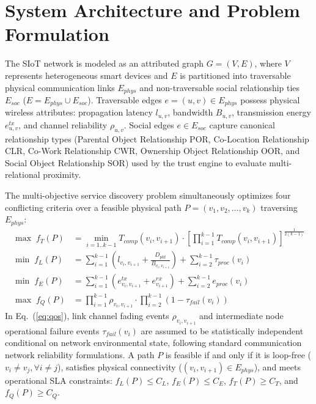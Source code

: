 \documentclass[journal,compsoc]{IEEEtran}
\begin{document}
\section{System Architecture and Problem Formulation}
The SIoT network is modeled as an attributed graph $G = (V, E)$, where $V$ represents heterogeneous smart devices and $E$ is partitioned into traversable physical communication links $E_{phys}$ and non-traversable social relationship ties $E_{soc}$ ($E = E_{phys} \cup E_{soc}$). Traversable edges $e = (u, v) \in E_{phys}$ possess physical wireless attributes: propagation latency $l_{u,v}$, bandwidth $B_{u,v}$, transmission energy $e_{u,v}^{tx}$, and channel reliability $\rho_{u,v}$. Social edges $e \in E_{soc}$ capture canonical relationship types (Parental Object Relationship POR, Co-Location Relationship CLR, Co-Work Relationship CWR, Ownership Object Relationship OOR, and Social Object Relationship SOR) used by the trust engine to evaluate multi-relational proximity.

The multi-objective service discovery problem simultaneously optimizes four conflicting criteria over a feasible physical path $P = (v_1, v_2, \dots, v_k)$ traversing $E_{phys}$:
\begin{align}
\max \; f_T(P) &= \min_{i=1..k-1} T_{comp}(v_i, v_{i+1}) \cdot \left[ \prod_{i=1}^{k-1} T_{comp}(v_i, v_{i+1}) \right]^{\frac{1}{2(k-1)}} \label{eq:trust} \\
\min \; f_L(P) &= \sum_{i=1}^{k-1} \left( l_{v_i, v_{i+1}} + \frac{D_{pkt}}{B_{v_i, v_{i+1}}} \right) + \sum_{i=2}^{k-1} \tau_{proc}(v_i) \label{eq:latency} \\
\min \; f_E(P) &= \sum_{i=1}^{k-1} \left( e_{v_i, v_{i+1}}^{tx} + e_{v_{i+1}}^{rx} \right) + \sum_{i=2}^{k-1} e_{proc}(v_i) \label{eq:energy} \\
\max \; f_Q(P) &= \prod_{i=1}^{k-1} \rho_{v_i, v_{i+1}} \cdot \prod_{i=2}^{k-1} (1 - \tau_{fail}(v_i)) \label{eq:qos}
\end{align}
In Eq.~(\ref{eq:qos}), link channel fading events $\rho_{v_i, v_{i+1}}$ and intermediate node operational failure events $\tau_{fail}(v_i)$ are assumed to be statistically independent conditional on network environmental state, following standard communication network reliability formulations. A path $P$ is feasible if and only if it is loop-free ($v_i \neq v_j, \forall i \neq j$), satisfies physical connectivity ($(v_i, v_{i+1}) \in E_{phys}$), and meets operational SLA constraints: $f_L(P) \le C_L$, $f_E(P) \le C_E$, $f_T(P) \ge C_T$, and $f_Q(P) \ge C_Q$.
\end{document}
